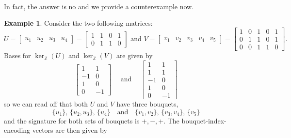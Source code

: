\documentclass[a4paper, 12pt]{article}
\newcommand{\ZZ}{\mathbb Z}
\theoremstyle{plain}
\theoremstyle{definition}
\newtheorem{example}[theorem]{Example}
\theoremstyle{remark}
\begin{document}
In fact, the answer is no and we provide a counterexample now. 

\begin{example}
\label{ex: same bouquet diff DR}
Consider the two following matrices:
\[
U=\begin{bmatrix} u_1 & u_2 & u_3 & u_4 \end{bmatrix}=\begin{bmatrix} 1&1&0&1\\0&1&1&0 \end{bmatrix}
\text{ and }
V=\begin{bmatrix} v_1 & v_2 & v_3 & v_4 & v_5 \end{bmatrix}=\begin{bmatrix} 1&0&1&0&1 \\ 0&1&1&0&1 \\ 0&0&1&1&0 \end{bmatrix}.
\]
Bases for $\ker_\ZZ(U)$ and $\ker_\ZZ(V)$ are given by
$$\begin{bmatrix}1&1\\-1&0\\1&0\\0&-1\end{bmatrix} \quad \text{ and } \quad \begin{bmatrix}1&1\\1&1\\-1&0\\1&0\\0&-1\end{bmatrix}$$
so we can read off that both $U$ and $V$ have three bouquets,
\[
\{u_1\},\, \{u_2,u_3\},\, \{u_4\}
\quad \text{and} \quad
\{v_1,v_2\},\, \{v_3,v_4\},\, \{v_5\}
\]
and the signature for both sets of bouquets is  $+,-,+$. %
The bouquet-index-encoding vectors are then given by

\end{example}
\end{document}
